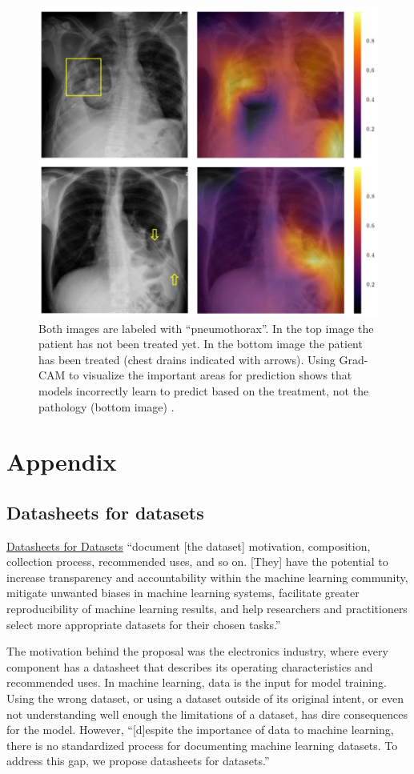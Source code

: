 \documentclass{article}
\begin{document}
\begin{figure}[!htb]
    \centering
    \includegraphics[width=0.7\columnwidth]{figures/chestX-ray8-pneumothorax-with-drain.png}
    \caption[Model erroneously picking up chest drains as main feature of ``pneumothorax''.]{Both images are labeled with ``pneumothorax''. In the top image the patient has not been treated yet. In the bottom image the patient has been treated (chest drains indicated with arrows). Using Grad-CAM \cite{Selvaraju2019} to visualize the important areas for prediction shows that models incorrectly learn to predict based on the treatment, not the pathology (bottom image) \cite{Baltruschat2019}.}
    \label{fig:chestX-ray8-pneumothorax-with-drain}
\end{figure}

\section{Appendix}

\subsection{Datasheets for datasets}

\href{https://arxiv.org/abs/1803.09010}{Datasheets for Datasets} ``document [the dataset] motivation, composition, collection process, recommended uses, and so on. [They] have the potential to increase transparency and accountability within the machine learning community, mitigate unwanted biases in machine learning systems, facilitate greater reproducibility of machine learning results, and help researchers and practitioners select more appropriate datasets for their chosen tasks.''

The motivation behind the proposal was the electronics industry, where every component has a datasheet that describes its operating characteristics and recommended uses. In machine learning, data is the input for model training. Using the wrong dataset, or using a dataset outside of its original intent, or even not understanding well enough the limitations of a dataset, has dire consequences for the model. However, ``[d]espite the importance of data to machine learning, there is no standardized process for documenting machine learning datasets. To address this gap, we propose datasheets for datasets.''



\end{document}
